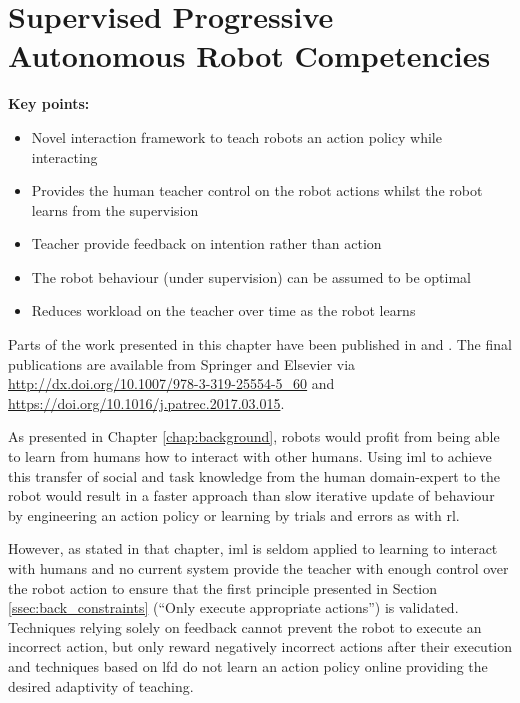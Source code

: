 \chapter{Supervised Progressive Autonomous Robot Competencies}\label{chap:sparc}

\begin{framed}
	\textbf{Key points:}
	
	\begin{itemize}
		\item Novel interaction framework to teach robots an action policy while interacting
		\item Provides the human teacher control on the robot actions whilst the robot learns from the supervision
		\item Teacher provide feedback on intention rather than action
		\item The robot behaviour (under supervision) can be assumed to be optimal
		\item Reduces workload on the teacher over time as the robot learns
	\end{itemize}
\end{framed}

Parts of the work presented in this chapter have been published in \cite{senft2015sparc} and \cite{senft2017supervised}. The final publications are available from Springer and Elsevier via \url{http://dx.doi.org/10.1007/978-3-319-25554-5_60} and \url{https://doi.org/10.1016/j.patrec.2017.03.015}.

\newpage


As presented in Chapter \ref{chap:background}, robots would profit from being able to learn from humans how to interact with other humans. Using \gls{iml} to achieve this transfer of social and task knowledge from the human domain-expert to the robot would result in a faster approach than slow iterative update of behaviour by engineering an action policy or learning by trials and errors as with \gls{rl}.

However, as stated in that chapter, \gls{iml} is seldom applied to learning to interact with humans and no current system provide the teacher with enough control over the robot action to ensure that the first principle presented in Section \ref{ssec:back_constraints} (``Only execute appropriate actions'') is validated. Techniques relying solely on feedback cannot prevent the robot to execute an incorrect action, but only reward negatively incorrect actions after their execution \citep{senft2017supervised} and techniques based on \gls{lfd} do not learn an action policy online providing the desired adaptivity of teaching.

